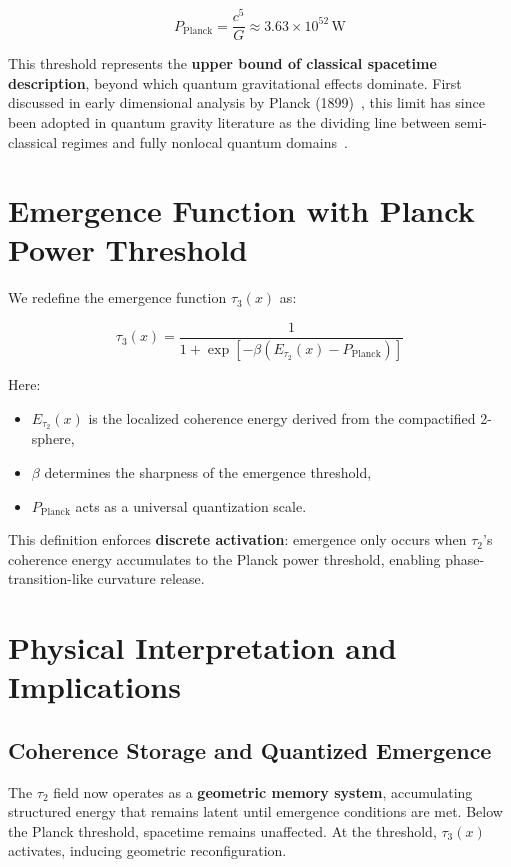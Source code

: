 \documentclass[12pt]{article}
\begin{document}
\[
P_\text{Planck} = \frac{c^5}{G} \approx 3.63 \times 10^{52} \, \text{W}
\]

This threshold represents the \textbf{upper bound of classical spacetime description}, beyond which quantum gravitational effects dominate. First discussed in early dimensional analysis by Planck (1899)~\cite{Planck1899}, this limit has since been adopted in quantum gravity literature as the dividing line between semi-classical regimes and fully nonlocal quantum domains~\cite{Padmanabhan1987,AmelinoCamelia2013}.

\section{Emergence Function with Planck Power Threshold}

We redefine the emergence function $\tau_3(x)$ as:

\[
\tau_3(x) = \frac{1}{1 + \exp\left[-\beta\left(E_{\tau_2}(x) - P_\text{Planck}\right)\right]}
\]

Here:
\begin{itemize}
    \item $E_{\tau_2}(x)$ is the localized coherence energy derived from the compactified 2-sphere,
    \item $\beta$ determines the sharpness of the emergence threshold,
    \item $P_\text{Planck}$ acts as a universal quantization scale.
\end{itemize}

This definition enforces \textbf{discrete activation}: emergence only occurs when $\tau_2$'s coherence energy accumulates to the Planck power threshold, enabling phase-transition-like curvature release.

\section{Physical Interpretation and Implications}

\subsection{Coherence Storage and Quantized Emergence}
The $\tau_2$ field now operates as a \textbf{geometric memory system}, accumulating structured energy that remains latent until emergence conditions are met. Below the Planck threshold, spacetime remains unaffected. At the threshold, $\tau_3(x)$ activates, inducing geometric reconfiguration.
\end{document}
